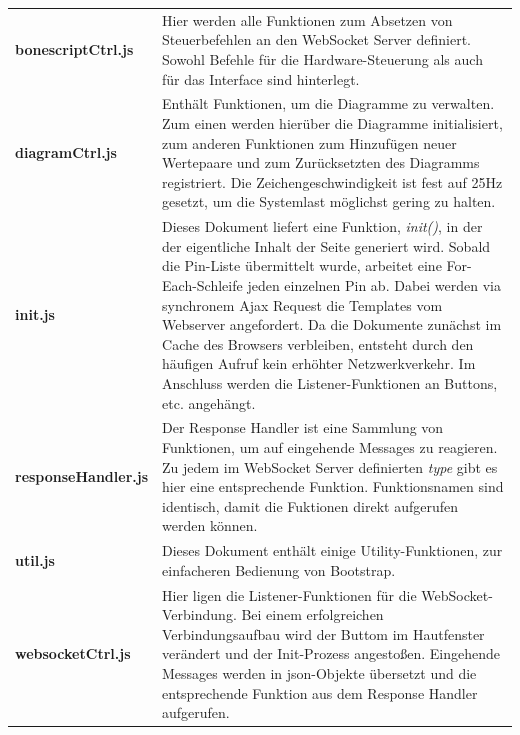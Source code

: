 \begin{longtabu} to \textwidth {
X[1]
X[3]}
\textbf{bonescriptCtrl.js} & Hier werden alle Funktionen zum Absetzen von Steuerbefehlen an den WebSocket Server definiert. Sowohl Befehle für die Hardware-Steuerung als auch für das Interface sind hinterlegt.\newline\\

\textbf{diagramCtrl.js} & Enthält Funktionen, um die Diagramme zu verwalten. Zum einen werden hierüber die Diagramme initialisiert, zum anderen Funktionen zum Hinzufügen neuer Wertepaare und zum Zurücksetzten des Diagramms registriert. Die Zeichengeschwindigkeit ist fest auf 25Hz gesetzt, um die Systemlast möglichst gering zu halten.\newline\\

\textbf{init.js} & Dieses Dokument liefert eine Funktion, \textit{init()}, in der der eigentliche Inhalt der Seite generiert wird. Sobald die Pin-Liste übermittelt wurde, arbeitet eine For-Each-Schleife jeden einzelnen Pin ab. Dabei werden via synchronem Ajax Request die Templates vom Webserver angefordert. Da die Dokumente zunächst im Cache des Browsers verbleiben, entsteht durch den häufigen Aufruf kein erhöhter Netzwerkverkehr. Im Anschluss werden die Listener-Funktionen an Buttons, etc. angehängt.\newline\\

\textbf{responseHandler.js} & Der Response Handler ist eine Sammlung von Funktionen, um auf eingehende Messages zu reagieren. Zu jedem im WebSocket Server definierten \textit{type} gibt es hier eine entsprechende Funktion. Funktionsnamen sind identisch, damit die Fuktionen direkt aufgerufen werden können.\newline\\

\textbf{util.js} & Dieses Dokument enthält einige Utility-Funktionen, zur einfacheren Bedienung von Bootstrap.\newline\\

\textbf{websocketCtrl.js} & Hier ligen die Listener-Funktionen für die WebSocket-Verbindung. Bei einem erfolgreichen Verbindungsaufbau wird der Buttom im Hautfenster verändert und der Init-Prozess angestoßen. Eingehende Messages werden in \gls{json}-Objekte übersetzt und die entsprechende Funktion aus dem Response Handler aufgerufen.\newline\\
\end{longtabu}


